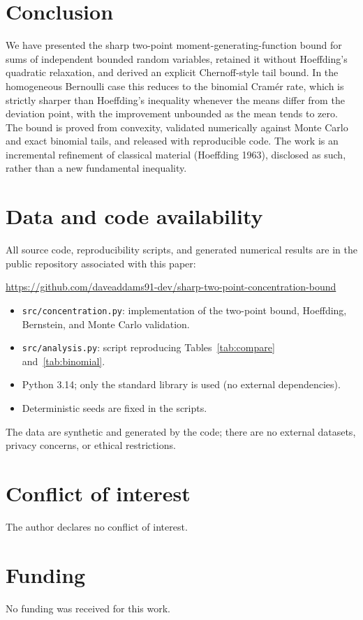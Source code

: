 \documentclass[11pt]{article}
\begin{document}
\section{Conclusion}
We have presented the sharp two-point moment-generating-function bound for sums of independent bounded random variables, retained it without Hoeffding's quadratic relaxation, and derived an explicit Chernoff-style tail bound. In the homogeneous Bernoulli case this reduces to the binomial Cram\'er rate, which is strictly sharper than Hoeffding's inequality whenever the means differ from the deviation point, with the improvement unbounded as the mean tends to zero. The bound is proved from convexity, validated numerically against Monte Carlo and exact binomial tails, and released with reproducible code. The work is an incremental refinement of classical material (Hoeffding 1963), disclosed as such, rather than a new fundamental inequality.

\section{Data and code availability}
All source code, reproducibility scripts, and generated numerical results are in the public repository associated with this paper:
\begin{center}
\url{https://github.com/daveaddams91-dev/sharp-two-point-concentration-bound}
\end{center}
\begin{itemize}
\item \texttt{src/concentration.py}: implementation of the two-point bound, Hoeffding, Bernstein, and Monte Carlo validation.
\item \texttt{src/analysis.py}: script reproducing Tables~\ref{tab:compare} and~\ref{tab:binomial}.
\item Python 3.14; only the standard library is used (no external dependencies).
\item Deterministic seeds are fixed in the scripts.
\end{itemize}
The data are synthetic and generated by the code; there are no external datasets, privacy concerns, or ethical restrictions.

\section*{Conflict of interest}
The author declares no conflict of interest.

\section*{Funding}
No funding was received for this work.
\end{document}
